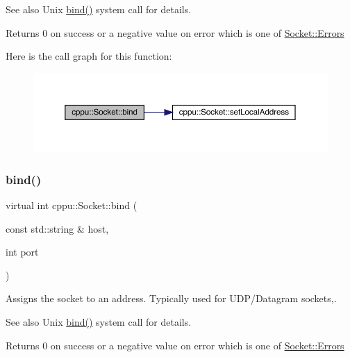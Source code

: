 \begin{DoxySeeAlso}{See also}
Unix \mbox{\hyperlink{classcppu_1_1_socket_a7b876dcaff0babaffde41575f9b19d64}{bind()}} system call for details. 
\end{DoxySeeAlso}
\begin{DoxyReturn}{Returns}
0 on success or a negative value on error which is one of \mbox{\hyperlink{classcppu_1_1_socket_a49ea5cb079bd7ae97ecf7eb30c9d9e5f}{Socket\+::\+Errors}} 
\end{DoxyReturn}
Here is the call graph for this function\+:
\nopagebreak
\begin{figure}[H]
\begin{center}
\leavevmode
\includegraphics[width=350pt]{classcppu_1_1_socket_a7b876dcaff0babaffde41575f9b19d64_cgraph}
\end{center}
\end{figure}
\mbox{\label{classcppu_1_1_socket_a5698a3a7c6c203676c6de5e5559a0a7f}} 
\subsubsection{\texorpdfstring{bind()}{bind()}\hspace{0.1cm}{\footnotesize\ttfamily [2/2]}}
{\footnotesize\ttfamily virtual int cppu\+::\+Socket\+::bind (\begin{DoxyParamCaption}\item[{const std\+::string \&}]{host,  }\item[{int}]{port }\end{DoxyParamCaption})\hspace{0.3cm}{\ttfamily [virtual]}}



Assigns the socket to an address. Typically used for U\+D\+P/\+Datagram sockets,. 

\begin{DoxySeeAlso}{See also}
Unix \mbox{\hyperlink{classcppu_1_1_socket_a7b876dcaff0babaffde41575f9b19d64}{bind()}} system call for details. 
\end{DoxySeeAlso}
\begin{DoxyReturn}{Returns}
0 on success or a negative value on error which is one of \mbox{\hyperlink{classcppu_1_1_socket_a49ea5cb079bd7ae97ecf7eb30c9d9e5f}{Socket\+::\+Errors}} 
\end{DoxyReturn}
\mbox{\label{classcppu_1_1_socket_ab958ef8a0f0495cf3a1c57a2ad4a34fc}} 
